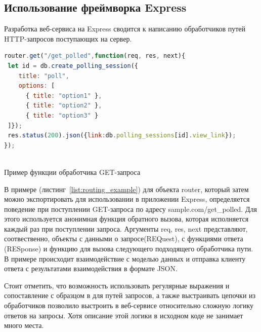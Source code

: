\subsection{Использование фреймворка Express}
Разработка веб-сервиса на Express сводится к написанию обработчиков путей HTTP-запросов поступающих на сервер.
\begin{ListingEnv}[H]
\begin{lstlisting}[language=JavaScript]
router.get("/get_polled",function(req, res, next){
 let id = db.create_polling_session({
	title: "poll",
	options: [
	  { title: "option1" },
	  { title: "option2" },
	  { title: "option3" }
 ]});
 res.status(200).json({link:db.polling_sessions[id].view_link});
});
	
\end{lstlisting}
\caption{Пример функции обработчика GET-запроса}
\label{list:routing_example}
\end{ListingEnv}
В примере (листинг~\ref{list:routing_example}) для объекта router, который затем можно экспортировать для использовании в приложении Express, определяется поведение при поступлении GET-запроса по адресу sample.com/get\_polled. Для этого используется анонимная функция обратного вызова, которая исполняется каждый раз при поступлении запроса. Аргументы req, res, next представляют, соотвественно, объекты с данными о запросе(REQuest), с функциями ответа (RESponse) и функцию для вызова следующего подходящего обработчика пути. В примере происходит взаимодействие с моделью данных и отправка клиенту ответа с результатами взаимодействия в формате JSON.

Стоит отметить, что возможность использовать регулярные выражения и сопоставление с образцом в для путей запросов, а также выстраивать цепочки из обработчиков позволило выстроить в веб-сервисе относительно сложную логику ответов на запросы. Хотя описание этой логики в исходном коде не занимает много места.  

